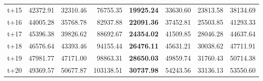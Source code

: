 \begin{table}[H]
\begin{tabular}{lrrrrrrr}
t+15  & 42372.91  & 32310.46  & 76755.35  & \textbf{19925.24}  & 33630.60  & 23813.58  & 38134.69  \\
t+16  & 44005.28  & 35768.78  & 82937.88  & \textbf{22091.36}  & 37452.81  & 25503.85  & 41293.33  \\
t+17  & 45396.38  & 39826.62  & 88692.67  & \textbf{24354.02}  & 41509.85  & 28046.28  & 44637.64  \\
t+18  & 46576.64  & 43393.46  & 94155.44  & \textbf{26476.11}  & 45631.21  & 30038.62  & 47711.91  \\
t+19  & 47981.77  & 47171.00  & 98863.31  & \textbf{28650.03}  & 49859.74  & 31760.43  & 50714.38  \\
t+20  & 49369.57  & 50677.87  & 103138.51  & \textbf{30737.98}  & 54243.56  & 33136.13  & 53550.60  \\

\bottomrule
\end{tabular}
\end{table}
